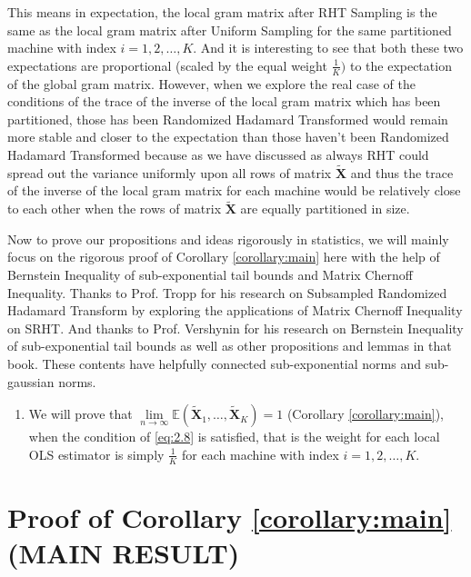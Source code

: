 \documentclass[11pt]{article}
\numberwithin{equation}{section}
\theoremstyle{plain}
\theoremstyle{definition}
\theoremstyle{remark}
\begin{document}
This means in expectation, the local gram matrix after RHT Sampling is the same as the local gram matrix after Uniform Sampling for the same partitioned machine with index $i = 1,2,\ldots,K$.
And it is interesting to see that both these two expectations are proportional (scaled by the equal weight $\frac{1}{K})$ to the expectation of the global gram matrix.
However, when we explore the real case of the conditions of the trace of the inverse of the local gram matrix which has been partitioned, those has been Randomized Hadamard Transformed would remain more stable and closer to the expectation than those haven't been Randomized Hadamard Transformed
because as we have discussed as always RHT could spread out the variance uniformly upon all rows of matrix $\mathbf{\tilde{X}}$ and thus
the trace of the inverse of the local gram matrix for each machine would be relatively close to each other when the rows of matrix $\mathbf{\tilde{X}}$ are equally partitioned in size.

Now to prove our propositions and ideas rigorously in statistics, we will mainly focus on the rigorous proof of Corollary \ref{corollary:main} here with the help of Bernstein Inequality of sub-exponential tail bounds and Matrix Chernoff Inequality.
Thanks to Prof. Tropp for his research on Subsampled Randomized Hadamard Transform by exploring the applications of Matrix Chernoff Inequality on SRHT.\cite{tropp2011improvedanalysissubsampledrandomized} And thanks to Prof. Vershynin for his research on Bernstein Inequality of sub-exponential tail bounds\cite{vershynin2018high} as well as other propositions and lemmas in that book.
These contents have helpfully connected sub-exponential norms and sub-gaussian norms.

\begin{enumerate}
\item We will prove that $\lim\limits_{n\to\infty}\mathbb{E}(\tilde{\mathbf{X}}_1,\ldots,\tilde{\mathbf{X}}_K) = 1$ (Corollary \ref{corollary:main}), when the condition of \ref{eq:2.8} is satisfied, that is the weight for each local OLS estimator is simply $\frac{1}{K}$ for each machine with index $i = 1,2,\ldots,K$.

\end{enumerate}
\section{Proof of Corollary \ref{corollary:main} (MAIN RESULT)}
\end{document}

